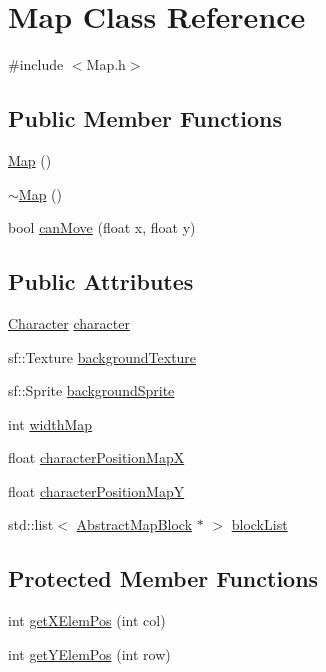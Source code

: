 \hypertarget{class_map}{}\section{Map Class Reference}
\label{class_map}


{\ttfamily \#include $<$Map.\+h$>$}

\subsection*{Public Member Functions}
\begin{DoxyCompactItemize}
\item 
\hyperlink{class_map_a0f5ad0fd4563497b4214038cbca8b582}{Map} ()
\item 
\hyperlink{class_map_aa403fbe09394ccf39747588f5168e3b2}{$\sim$\+Map} ()
\item 
bool \hyperlink{class_map_a9e0db2b7f0c2cc2083da543050f0fa91}{can\+Move} (float x, float y)
\end{DoxyCompactItemize}
\subsection*{Public Attributes}
\begin{DoxyCompactItemize}
\item 
\hyperlink{class_character}{Character} \hyperlink{class_map_a00d7fac6e87f2ac95d0182bbb22fdac4}{character}
\item 
sf\+::\+Texture \hyperlink{class_map_a18202f9ebc5ddab14652bdacc81e3c72}{background\+Texture}
\item 
sf\+::\+Sprite \hyperlink{class_map_aa92b0ecd899641e3385613efcd037f65}{background\+Sprite}
\item 
int \hyperlink{class_map_ac62ec077cb012a9fe7d987b466a48947}{width\+Map}
\item 
float \hyperlink{class_map_acfd2fda55638ba32a092fac314f9f1c5}{character\+Position\+MapX}
\item 
float \hyperlink{class_map_aa4e4d68c7babc74782b973a3b97431ea}{character\+Position\+MapY}
\item 
std\+::list$<$ \hyperlink{class_abstract_map_block}{Abstract\+Map\+Block} $\ast$ $>$ \hyperlink{class_map_ad185fe5369037999533e218f3f7ade8a}{block\+List}
\end{DoxyCompactItemize}
\subsection*{Protected Member Functions}
\begin{DoxyCompactItemize}
\item 
int \hyperlink{class_map_a46c8ba4683ce97e3f5120be02b0ace94}{get\+X\+Elem\+Pos} (int col)
\item 
int \hyperlink{class_map_a8efab6f1e807cb4cb576fc5dcfed3075}{get\+Y\+Elem\+Pos} (int row)
\end{DoxyCompactItemize}


